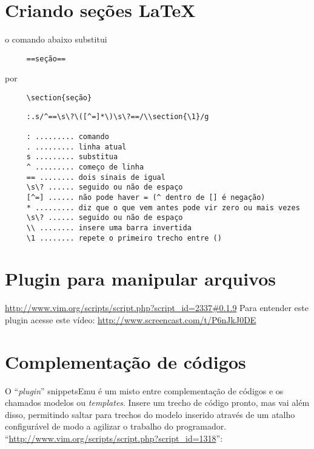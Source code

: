 \section{Criando seções \LaTeX}\label{Criando seções latex}
o comando abaixo substitui

\begin{verbatim}
     ==seção==
\end{verbatim}

   por

\begin{verbatim}
     \section{seção}
\end{verbatim}

\begin{verbatim}
     :.s/^==\s\?\([^=]*\)\s\?==/\\section{\1}/g
     
     : ......... comando
     . ......... linha atual
     s ......... substitua
     ^ ......... começo de linha
     == ........ dois sinais de igual
     \s\? ...... seguido ou não de espaço
     [^=] ...... não pode haver = (^ dentro de [] é negação)
     * ......... diz que o que vem antes pode vir zero ou mais vezes
     \s\? ...... seguido ou não de espaço
     \\ ........ insere uma barra invertida
     \1 ........ repete o primeiro trecho entre ()
\end{verbatim}

\section{Plugin para manipular arquivos}
\url{http://www.vim.org/scripts/script.php?script\_id=2337#0.1.9}
Para entender este plugin acesse este vídeo:
 \url{http://www.screencast.com/t/P6nJkJ0DE}


\section{Complementação de códigos}
\label{Complementação de códigos}

O ``{\em plugin}'' snippetsEmu é um misto entre complementação de códigos e
os chamados modelos ou {\em templates}. Insere um trecho de código pronto,
mas vai além disso, permitindo saltar para trechos do modelo inserido
através de um atalho configurável de modo a agilizar o trabalho do
programador. ``\url{http://www.vim.org/scripts/script.php?script\_id=1318}'':


